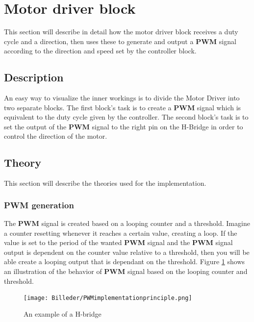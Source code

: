 \section{Motor driver block}

This section will describe in detail how the motor driver block receives a duty cycle and a direction, then uses these to generate and output a \textbf{PWM} signal according to the direction and speed set by the controller block.

\subsection{Description}

An easy way to visualize the inner workings is to divide the Motor Driver into two separate blocks. The first block’s task is to create a \textbf{PWM} signal which is equivalent to the duty cycle given by the controller. The second block’s task is to set the output of the \textbf{PWM} signal to the right pin on the H-Bridge in order to control the direction of the motor.

\subsection{Theory}

This section will describe the theories used for the implementation.

\subsubsection{PWM generation}

The \textbf{PWM} signal is created based on a looping counter and a threshold. Imagine a counter resetting whenever it reaches a certain value, creating a loop. If the value is set to the period of the wanted \textbf{PWM} signal and the \textbf{PWM} signal output is dependent on the counter value relative to a threshold, then you will be able create a looping output that is dependant on the threshold. Figure \ref{fig:PWMimplementationprinciple} shows an illustration of the behavior of \textbf{PWM} signal based on the looping counter and threshold.

\begin{figure}[h!]
	\centering
	\texttt{[image: Billeder/PWMimplementationprinciple.png]}
	\caption{ An example of a H-bridge }
	\label{fig:PWMimplementationprinciple}
\end{figure}


